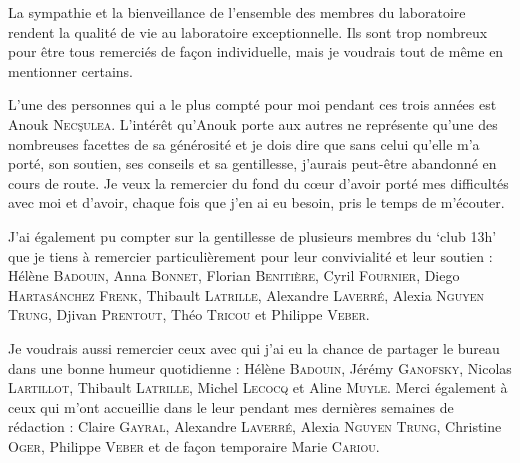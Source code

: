 La sympathie et la bienveillance de l'ensemble des membres du laboratoire rendent la qualité de vie au laboratoire exceptionnelle.
Ils sont trop nombreux pour être tous remerciés de façon individuelle, mais je voudrais tout de même en mentionner certains.



L'une des personnes qui a le plus compté pour moi pendant ces trois années est Anouk \textsc{Nec\c{s}ulea}.
L'intérêt qu'Anouk porte aux autres ne représente qu'une des nombreuses facettes de sa générosité et je dois dire que sans celui qu'elle m'a porté, son soutien, ses conseils et sa gentillesse, j'aurais peut-être abandonné en cours de route.
Je veux la remercier du fond du cœur d'avoir porté mes difficultés avec moi et d'avoir, chaque fois que j'en ai eu besoin, pris le temps de m'écouter.


J'ai également pu compter sur la gentillesse de plusieurs membres du ‘club 13h’ que je tiens à remercier particulièrement pour leur convivialité et leur soutien :
Hélène \textsc{Badouin},
Anna \textsc{Bonnet},
Florian \textsc{Benitière},
Cyril \textsc{Fournier},
Diego \textsc{Hartas\'anchez Frenk},
Thibault \textsc{Latrille},
Alexandre \textsc{Laverré}, Alexia \textsc{Nguyen Trung},
Djivan \textsc{Prentout},
Théo \textsc{Tricou} et
Philippe \textsc{Veber}.




Je voudrais aussi remercier ceux avec qui j'ai eu la chance de partager le bureau dans une bonne humeur quotidienne : Hélène \textsc{Badouin}, Jérémy \textsc{Ganofsky}, Nicolas \textsc{Lartillot}, Thibault \textsc{Latrille}, Michel \textsc{Lecocq} et Aline \textsc{Muyle}.
Merci également à ceux qui m'ont accueillie dans le leur pendant mes dernières semaines de rédaction : Claire \textsc{Gayral}, Alexandre \textsc{Laverré}, Alexia \textsc{Nguyen Trung}, Christine \textsc{Oger}, Philippe \textsc{Veber} et de façon temporaire Marie \textsc{Cariou}.

